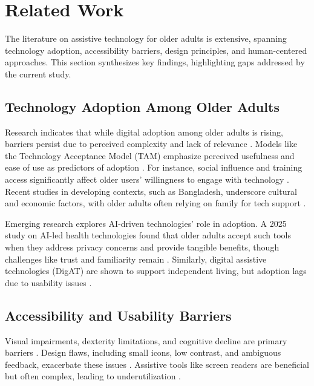 \documentclass[acmlarge]{acmart}
\begin{document}
\section{Related Work}
The literature on assistive technology for older adults is extensive, spanning technology adoption, accessibility barriers, design principles, and human-centered approaches. This section synthesizes key findings, highlighting gaps addressed by the current study.

\subsection{Technology Adoption Among Older Adults}
Research indicates that while digital adoption among older adults is rising, barriers persist due to perceived complexity and lack of relevance \cite{morris2019techbarriers, peacock2020elderlyusage, anderson2020aging}. Models like the Technology Acceptance Model (TAM) emphasize perceived usefulness and ease of use as predictors of adoption \cite{davis1989tam, venkatesh2003vtaut}. For instance, social influence and training access significantly affect older users' willingness to engage with technology \cite{rodriguez2018oldertech, ma2016acceptance, lee2017adoption}. Recent studies in developing contexts, such as Bangladesh, underscore cultural and economic factors, with older adults often relying on family for tech support \cite{islam2019elderlybangladesh}.

Emerging research explores AI-driven technologies' role in adoption. A 2025 study on AI-led health technologies found that older adults accept such tools when they address privacy concerns and provide tangible benefits, though challenges like trust and familiarity remain \cite{lee2025aiolderadults}. Similarly, digital assistive technologies (DigAT) are shown to support independent living, but adoption lags due to usability issues \cite{jones2025digat}.

\subsection{Accessibility and Usability Barriers}
Visual impairments, dexterity limitations, and cognitive decline are primary barriers \cite{johnson2022accessibility, kurniawan2008older, arch2008webaccess}. Design flaws, including small icons, low contrast, and ambiguous feedback, exacerbate these issues \cite{tanaka2020mobileux, hanson2010age, dickinson2007accessibility}. Assistive tools like screen readers are beneficial but often complex, leading to underutilization \cite{frank2018assistiveuse, patterson2021voicebarriers}.
\end{document}
